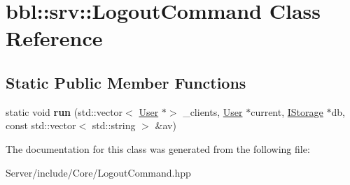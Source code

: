 \hypertarget{classbbl_1_1srv_1_1_logout_command}{}\section{bbl\+:\+:srv\+:\+:Logout\+Command Class Reference}
\label{classbbl_1_1srv_1_1_logout_command}
\subsection*{Static Public Member Functions}
\begin{DoxyCompactItemize}
\item 
\mbox{\label{classbbl_1_1srv_1_1_logout_command_a2c51ad737f53fa197d082cefba3c3509}} 
static void {\bfseries run} (std\+::vector$<$ \hyperlink{classbbl_1_1srv_1_1_user}{User} $\ast$$>$ \+\_\+clients, \hyperlink{classbbl_1_1srv_1_1_user}{User} $\ast$current, \hyperlink{classbbl_1_1srv_1_1_i_storage}{I\+Storage} $\ast$db, const std\+::vector$<$ std\+::string $>$ \&av)
\end{DoxyCompactItemize}


The documentation for this class was generated from the following file\+:\begin{DoxyCompactItemize}
\item 
Server/include/\+Core/Logout\+Command.\+hpp\end{DoxyCompactItemize}
